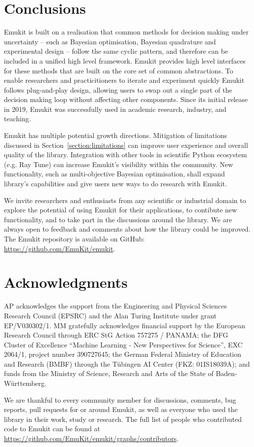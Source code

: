 \section{Conclusions}
Emukit is built on a realisation that common methods for decision making under uncertainty -- such as Bayesian optimisation, Bayesian quadrature and experimental design -- follow the same cyclic pattern, and therefore can be included in a unified high level framework. Emukit provides high level interfaces for these methods that are built on the core set of common abstractions. To enable researchers and practicitioners to iterate and experiment quickly Emukit follows plug-and-play design, allowing users to swap out a single part of the decision making loop without affecting other components. Since its initial release in 2019, Emukit was successfully used in academic research, industry, and teaching.

Emukit has multiple potential growth directions. Mitigation of limitations discussed in Section~\ref{section:limitations} can improve user experience and overall quality of the library. Integration with other tools in scientific Python ecosystem (e.g. Ray Tune) can increase Emukit's visibility within the community. New functionality, such as multi-objective Bayesian optimisation, shall expand library's capabilities and give users new ways to do research with Emukit.

We invite researchers and enthusiasts from any scientific or industrial domain to explore the potential of using Emukit for their applications, to contibute new functionality, and to take part in the discussions around the library. We are always open to feedback and comments about how the library could be improved. The Emukit repository is available on GitHub: \url{https://github.com/EmuKit/emukit}.

\section{Acknowledgments}
AP acknowledges the support from the Engineering and Physical Sciences Research Council (EPSRC) and the Alan Turing Institute under grant EP/V030302/1. MM gratefully acknowledges financial support by the European Research Council through ERC StG Action 757275 / PANAMA; the DFG Cluster of Excellence “Machine Learning - New Perspectives for Science”, EXC 2064/1, project number 390727645; the German Federal Ministry of Education and Research (BMBF) through the T\"{u}bingen AI Center (FKZ: 01IS18039A); and funds from the Ministry of Science, Research and Arts of the State of Baden-W\"{u}rttemberg.

We are thankful to every community member for discussions, comments, bug reports, pull requests for or around Emukit, as well as everyone who used the library in their work, study or research. The full list of people who contributed code to Emukit can be found at \url{https://github.com/EmuKit/emukit/graphs/contributors}.
